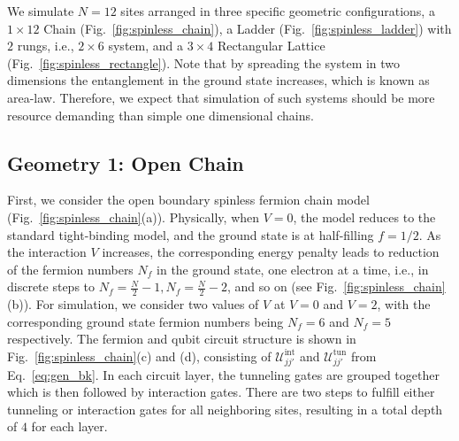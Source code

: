 \documentclass[aps, pra, reprint, superscriptaddress]{revtex4-1}
\begin{document}
We simulate $N {=} 12$ sites arranged in three specific geometric configurations, a $1{\times}12$ Chain (Fig.~\ref{fig:spinless_chain}), a Ladder (Fig.~\ref{fig:spinless_ladder}) with $2$ rungs, i.e., $2{\times} 6$ system, and a $3{\times} 4$ Rectangular Lattice (Fig.~\ref{fig:spinless_rectangle}).  
Note that by spreading the system in two dimensions the entanglement in the ground state increases, which is known as area-law. Therefore, we expect that simulation of such systems should be more resource demanding than simple one dimensional chains.  


\subsection{Geometry 1: Open Chain}
\label{subsec:spinless_open_chain}
First, we consider the open boundary spinless fermion chain model (Fig.~\ref{fig:spinless_chain}(a)).  Physically, when $V{=}0$, the model reduces to the standard tight-binding model, and the ground state is at half-filling $f{=}1/2$. As the interaction $V$ increases, the corresponding energy penalty leads to reduction of the fermion numbers $N_f$ in the ground state, one electron at a time, i.e., in discrete steps to $N_f{=}\frac{N}{2} -1, N_f{=}\frac{N}{2} {-}2$, and so on (see Fig.~\ref{fig:spinless_chain}(b)). For simulation, we consider two values of $V$ at $V{=}0$ and $V{=}2$, with the corresponding ground state fermion numbers being $N_f{=}6$ and $N_f{=}5$ respectively. 
The fermion and qubit circuit structure is shown in Fig.~\ref{fig:spinless_chain}(c) and (d), consisting of $\mathcal{U}^{\text{int}}_{jj'}$ and $\mathcal{U}^{\text{tun}}_{jj'}$ from Eq.~\eqref{eq:gen_bk}. 
In each circuit layer, the tunneling gates are grouped together which is then followed by interaction gates. 
There are two steps to fulfill either tunneling or interaction gates for all neighboring sites, resulting in a total depth of $4$ for each layer.
\end{document}
